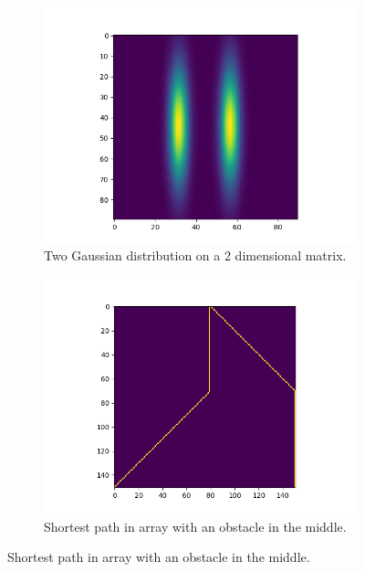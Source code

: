 \documentclass{article}
\begin{document}
    \begin{figure}[h!]
        \centering
        \begin{subfigure}[b]{0.4\linewidth}
            \includegraphics[width=\linewidth]{fig1.png}
            \caption{Two Gaussian distribution on a 2 dimensional matrix.}
            \label{gaussian}
        \end{subfigure}
        \begin{subfigure}[b]{0.4\linewidth}
            \includegraphics[width=\linewidth]{fig2.png}
            \caption{Shortest path in array with an obstacle in the middle.}
            \label{astar}
        \end{subfigure}
    \end{figure}



    \printbibliography{}
\end{document}
